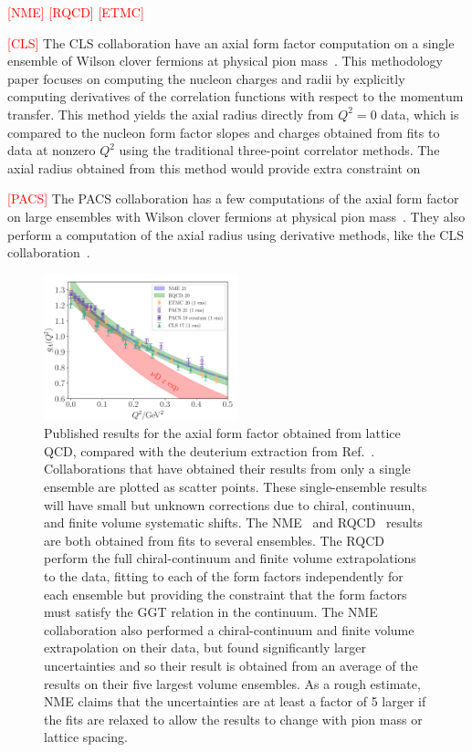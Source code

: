 \textcolor{red}{[NME]}
\textcolor{red}{[RQCD]}
\textcolor{red}{[ETMC]}

\textcolor{red}{[CLS]}
The CLS collaboration have an axial form factor computation on a
 single ensemble of Wilson clover fermions at physical pion mass~\cite{Hasan:2017wwt}.
This methodology paper focuses on computing the nucleon charges
 and radii by explicitly computing derivatives of the correlation functions
 with respect to the momentum transfer.
This method yields the axial radius directly from $Q^2=0$ data,
 which is compared to the nucleon form factor slopes and charges obtained from
 fits to data at nonzero $Q^2$ using the traditional three-point correlator methods.
The axial radius obtained from this method would provide extra constraint on

\textcolor{red}{[PACS]}
The PACS collaboration has a few computations of the axial form factor
 on large ensembles with Wilson clover fermions at
 physical pion mass~\cite{Ishikawa:2018rew,Shintani:2018ozy}.
They also perform a computation of the axial radius using derivative methods,
 like the CLS collaboration~\cite{Ishikawa:2021eut}.

\begin{figure}[hbt!]
\centering
\includegraphics[width=0.5\textwidth]{plots/gaq2-overlay-standalone.pdf}
\caption{
Published results for the axial form factor obtained from lattice QCD,
 compared with the deuterium extraction from Ref.~\cite{Meyer:2016oeg}.
Collaborations that have obtained their results from only a single ensemble
 are plotted as scatter points.
These single-ensemble results will have small but unknown corrections due to chiral, continuum,
 and finite volume systematic shifts.
The NME~\cite{Park:2021ypf} and RQCD~\cite{RQCD:2019jai}
 results are both obtained from fits to several ensembles.
The RQCD perform the full chiral-continuum and finite volume extrapolations to the data,
 fitting to each of the form factors independently for each ensemble but providing
 the constraint that the form factors must satisfy the GGT relation in the continuum.
The NME collaboration also performed a chiral-continuum and finite volume extrapolation
 on their data, but found significantly larger uncertainties and so their result
 is obtained from an average of the results on their five largest volume ensembles.
As a rough estimate, NME claims that the uncertainties are at least a factor of 5 larger
 if the fits are relaxed to allow the results to change with pion mass or lattice spacing.
}
\end{figure}

